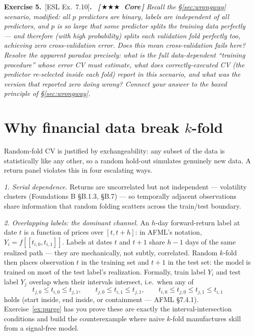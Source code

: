\documentclass[11pt]{article}
\numberwithin{equation}{section}
\theoremstyle{plain}
\theoremstyle{definition}
\theoremstyle{remark}
\newcounter{exercise}
\renewcommand{\theexercise}{5.\arabic{exercise}}
\newenvironment{exercise}[1][]{\refstepcounter{exercise}\par\medskip
  \noindent\textbf{Exercise \theexercise}\if\relax\detokenize{#1}\relax\else\ \textnormal{[#1]}\fi\textbf{.}\ \itshape}{\par\medskip}
\newcommand{\prioCore}{{\normalfont\small\textbf{\textcolor{necblue}{[\,\ensuremath{\bigstar\bigstar\bigstar}\ Core\,]}}}\hspace{0.5em}}
\begin{document}
\begin{exercise}[ESL Ex.\ 7.10]\label{ex:esl710}
\prioCore
Recall the \S\ref{sec:wrongway} scenario, modified: all $p$ predictors are \emph{binary}, labels are independent of all predictors, and $p$ is so large that some predictor splits the training data perfectly --- and therefore (with high probability) splits each validation fold perfectly too, achieving zero cross-validation error.
Does this mean cross-validation fails here? Resolve the apparent paradox precisely: what is the full data-dependent ``training procedure'' whose error CV must estimate, what does correctly-executed CV (the predictor re-selected \emph{inside} each fold) report in this scenario, and what was the version that reported zero doing wrong? Connect your answer to the boxed principle of \S\ref{sec:wrongway}.
\end{exercise}


\section{Why financial data break $k$-fold}\label{sec:break}

Random-fold CV is justified by exchangeability: any subset of the data is statistically like any other, so a random hold-out simulates genuinely new data. A return panel violates this in four escalating ways.

\emph{1. Serial dependence.} Returns are uncorrelated but not independent --- volatility clusters (Foundations B \S B.1.3, \S B.7) --- so temporally adjacent observations share information that random folding scatters across the train/test boundary.

\emph{2. Overlapping labels: the dominant channel.} An $h$-day forward-return label at date $t$ is a function of prices over $[t, t+h]$: in AFML's notation, $Y_i = f[[t_{i,0}, t_{i,1}]]$. Labels at dates $t$ and $t+1$ share $h - 1$ days of the same realized path --- they are mechanically, not subtly, correlated. Random $k$-fold then places observation $t$ in the training set and $t+1$ in the test set: the model is trained on most of the test label's realization. Formally, train label $Y_i$ and test label $Y_j$ overlap when their intervals intersect, i.e.\ when any of
\begin{equation}
t_{j,0} \le t_{i,0} \le t_{j,1},
\qquad
t_{j,0} \le t_{i,1} \le t_{j,1},
\qquad
t_{i,0} \le t_{j,0} \le t_{j,1} \le t_{i,1}
\label{eq:overlap}
\end{equation}
holds (start inside, end inside, or containment --- AFML \S7.4.1). Exercise~\ref{ex:purge} has you prove these are exactly the interval-intersection conditions and build the counterexample where naive $k$-fold manufactures skill from a signal-free model.
\end{document}
